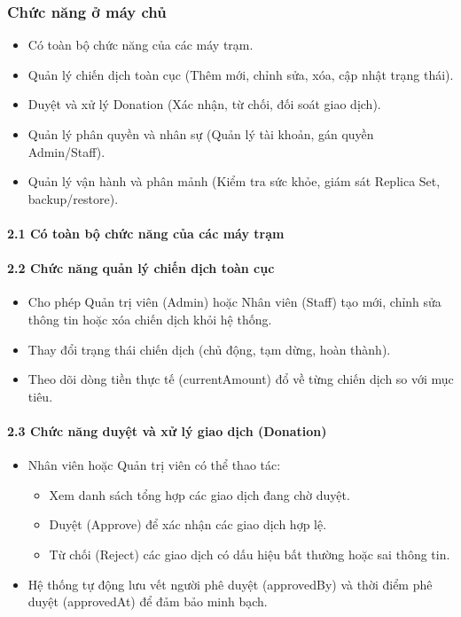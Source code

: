 \documentclass[12pt,a4paper]{article}
\begin{document}
\subsubsection{Chức năng ở máy chủ}

\begin{itemize}
    \item Có toàn bộ chức năng của các máy trạm.
    \item Quản lý chiến dịch toàn cục (Thêm mới, chỉnh sửa, xóa, cập nhật trạng thái).
    \item Duyệt và xử lý Donation (Xác nhận, từ chối, đối soát giao dịch).
    \item Quản lý phân quyền và nhân sự (Quản lý tài khoản, gán quyền Admin/Staff).
    \item Quản lý vận hành và phân mảnh (Kiểm tra sức khỏe, giám sát Replica Set, backup/restore).
\end{itemize}

\paragraph{2.1 Có toàn bộ chức năng của các máy trạm} \mbox{} 

\paragraph{2.2 Chức năng quản lý chiến dịch toàn cục} \mbox{} 

\begin{itemize}
    \item Cho phép Quản trị viên (Admin) hoặc Nhân viên (Staff) tạo mới, chỉnh sửa thông tin hoặc xóa chiến dịch khỏi hệ thống. 
    \item Thay đổi trạng thái chiến dịch (chủ động, tạm dừng, hoàn thành). 
    \item Theo dõi dòng tiền thực tế (currentAmount) đổ về từng chiến dịch so với mục tiêu.
\end{itemize}

\paragraph{2.3 Chức năng duyệt và xử lý giao dịch (Donation)} \mbox{} 

\begin{itemize}
    \item Nhân viên hoặc Quản trị viên có thể thao tác: 
    \begin{itemize}
    \item Xem danh sách tổng hợp các giao dịch đang chờ duyệt.
    \item Duyệt (Approve) để xác nhận các giao dịch hợp lệ.
    \item Từ chối (Reject) các giao dịch có dấu hiệu bất thường hoặc sai thông tin. 
    \end{itemize}
    \item Hệ thống tự động lưu vết người phê duyệt (approvedBy) và thời điểm phê duyệt (approvedAt) để đảm bảo minh bạch.
\end{itemize}
\end{document}
